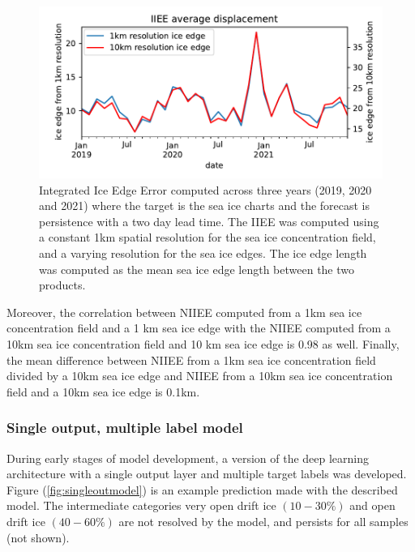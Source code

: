 \documentclass[../main/thesis]{subfiles}
\begin{document}
\begin{figure}[h]
    \centering
    \includegraphics[width=1.\textwidth]{normalized_iiee}
    \caption{\label{fig:iiee_1km_10km}Integrated Ice Edge Error computed across three years (2019, 2020 and 2021) where the target is the sea ice charts and the forecast is persistence with a two day lead time. The IIEE was computed using a constant 1km spatial resolution for the sea ice concentration field, and a varying resolution for the sea ice edges. The ice edge length was computed as the mean sea ice edge length between the two products.}
\end{figure}

Moreover, the correlation between NIIEE computed from a 1km sea ice concentration field and a 1 km sea ice edge with the NIIEE computed from a 10km sea ice concentration field and 10 km sea ice edge is 0.98 as well. Finally, the mean difference between NIIEE from a 1km sea ice concentration field divided by a 10km sea ice edge and NIIEE from a 10km sea ice concentration field and a 10km sea ice edge is 0.1km.  

\subsubsection{Single output, multiple label model}
\label{sec:singleoutputmodel}
During early stages of model development, a version of the deep learning architecture with a single output layer and multiple target labels was developed. Figure (\ref{fig:singleoutmodel}) is an example prediction made with the described model. The intermediate categories very open drift ice $(10 - 30\%)$ and open drift ice $(40 - 60\%)$ are not resolved by the model, and persists for all samples (not shown). 
\end{document}
